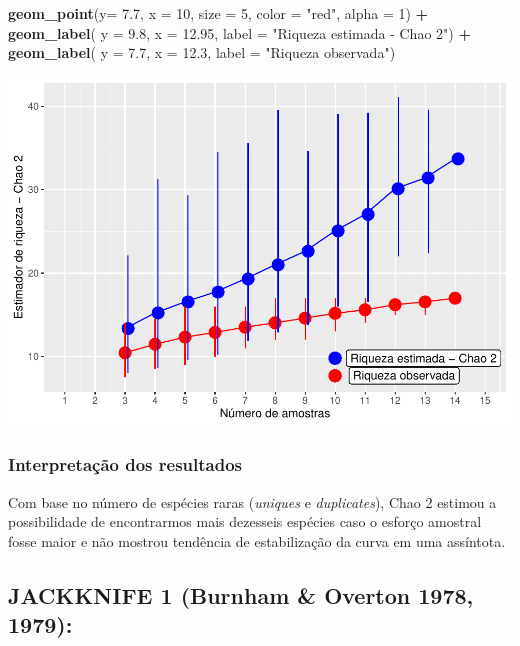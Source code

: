 \documentclass[
]{book}
\newenvironment{Shaded}{\begin{snugshade}}{\end{snugshade}}
\newcommand{\DataTypeTok}[1]{\textcolor[rgb]{0.13,0.29,0.53}{#1}}
\newcommand{\DecValTok}[1]{\textcolor[rgb]{0.00,0.00,0.81}{#1}}
\newcommand{\FloatTok}[1]{\textcolor[rgb]{0.00,0.00,0.81}{#1}}
\newcommand{\KeywordTok}[1]{\textcolor[rgb]{0.13,0.29,0.53}{\textbf{#1}}}
\newcommand{\NormalTok}[1]{#1}
\newcommand{\OperatorTok}[1]{\textcolor[rgb]{0.81,0.36,0.00}{\textbf{#1}}}
\newcommand{\StringTok}[1]{\textcolor[rgb]{0.31,0.60,0.02}{#1}}
\begin{document}
\begin{Shaded}
\begin{Highlighting}[]
\StringTok{  }\KeywordTok{geom_point}\NormalTok{(}\DataTypeTok{y=} \FloatTok{7.7}\NormalTok{, }\DataTypeTok{x =} \DecValTok{10}\NormalTok{, }\DataTypeTok{size =} \DecValTok{5}\NormalTok{, }\DataTypeTok{color =} \StringTok{"red"}\NormalTok{, }\DataTypeTok{alpha =} \DecValTok{1}\NormalTok{) }\OperatorTok{+}\StringTok{ }
\StringTok{  }\KeywordTok{geom_label}\NormalTok{( }\DataTypeTok{y =} \FloatTok{9.8}\NormalTok{, }\DataTypeTok{x =} \FloatTok{12.95}\NormalTok{, }\DataTypeTok{label =} \StringTok{"Riqueza estimada - Chao 2"}\NormalTok{) }\OperatorTok{+}
\StringTok{  }\KeywordTok{geom_label}\NormalTok{( }\DataTypeTok{y =} \FloatTok{7.7}\NormalTok{, }\DataTypeTok{x =} \FloatTok{12.3}\NormalTok{, }\DataTypeTok{label =} \StringTok{"Riqueza observada"}\NormalTok{)}
\end{Highlighting}
\end{Shaded}

\includegraphics{livro_r_ecologia_files/figure-latex/unnamed-chunk-48-1.pdf}

\hypertarget{interpretauxe7uxe3o-dos-resultados-2}{%
\subsubsection{Interpretação dos resultados}\label{interpretauxe7uxe3o-dos-resultados-2}}

Com base no número de espécies raras (\emph{uniques} e \emph{duplicates}), Chao 2 estimou a possibilidade de encontrarmos mais dezesseis espécies caso o esforço amostral fosse maior e não mostrou tendência de estabilização da curva em uma assíntota.

\hypertarget{jackknife-1-burnham-overton-1978-1979}{%
\subsection{JACKKNIFE 1 (Burnham \& Overton 1978, 1979):}\label{jackknife-1-burnham-overton-1978-1979}}
\end{document}
